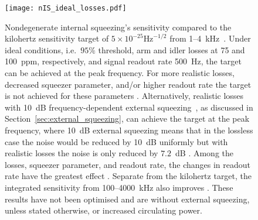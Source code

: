 \begin{figure}
    \centering
    \texttt{[image: nIS\_ideal\_losses.pdf]}
    \caption{   Nondegenerate internal squeezing's sensitivity compared to the kilohertz sensitivity target of $5\times10^{-25}\text{Hz}^{-1/2}$ from 1--4~kHz~\cite{Miao2018}. Under ideal conditions, i.e.\ $95\%$ threshold, arm and idler losses at 75 and 100~ppm, respectively, and signal readout rate 500~Hz, the target can be achieved at the peak frequency. For more realistic losses, decreased squeezer parameter, and/or higher readout rate the target is not achieved for these parameters . Alternatively, realistic losses with 10~dB frequency-dependent external squeezing~\cite{}, as discussed in Section~\ref{sec:external_squeezing}, can achieve the target at the peak frequency, where 10~dB external squeezing means that in the lossless case the noise would be reduced by 10~dB uniformly but with realistic losses the noise is only reduced by $7.2$~dB . Among the losses, squeezer parameter, and readout rate, the changes in readout rate have the greatest effect . %
    Separate from the kilohertz target, the integrated sensitivity from 100--4000~kHz also improves . These results have not been optimised and are without external squeezing, unless stated otherwise, or increased circulating power.}
    \label{fig:nIS_sens_target}
\end{figure}

